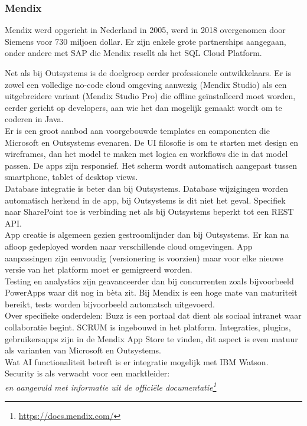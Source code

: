 \subsubsection{Mendix}

Mendix werd opgericht in Nederland in 2005, werd in 2018 overgenomen door Siemens voor 730 miljoen dollar. Er zijn enkele grote partnerships aangegaan, onder andere met SAP die Mendix resellt als het SQL Cloud Platform.

Net als bij Outsystems is de doelgroep eerder professionele ontwikkelaars. Er is zowel een volledige no-code cloud omgeving aanwezig (Mendix Studio) als een uitgebreidere variant (Mendix Studio Pro) die offline geïnstalleerd moet worden, eerder gericht op developers, aan wie het dan mogelijk gemaakt wordt om te coderen in Java.\\
Er is een groot aanbod aan voorgebouwde templates en componenten die Microsoft en Outsystems evenaren.
De UI filosofie is om te starten met design en wireframes, dan het model te maken met logica en workflows die in dat model passen. De apps zijn responsief. Het scherm wordt automatisch aangepast tussen smartphone, tablet of desktop views.\\
Database integratie is beter dan bij Outsystems. Database wijzigingen worden automatisch herkend in de app, bij Outsystems is dit niet het geval. Specifiek naar SharePoint toe is verbinding net als bij Outsystems beperkt tot een REST API.\\
App creatie is algemeen gezien gestroomlijnder dan bij Outsystems. Er kan na afloop gedeployed worden naar verschillende cloud omgevingen. %
App aanpassingen zijn eenvoudig (versionering is voorzien) maar voor elke nieuwe versie van het platform moet er gemigreerd worden.\\
Testing en analystics zijn geavanceerder dan bij concurrenten zoals bijvoorbeeld PowerApps waar dit nog in bèta zit. Bij Mendix is een hoge mate van maturiteit bereikt, tests worden bijvoorbeeld automatsch uitgevoerd.\\
Over specifieke onderdelen: Buzz is een portaal dat dient als sociaal intranet waar collaboratie begint. SCRUM is ingebouwd in het platform. Integraties, plugins, gebruikersapps zijn in de Mendix App Store te vinden, dit aspect is even matuur als varianten van Microsoft en Outsystems.\\
Wat AI functionaliteit betreft is er integratie mogelijk met IBM Watson.\\
Security is als verwacht voor een marktleider: \\ %
\autocite{Marvin2017a} \textit{en aangevuld met informatie uit de officiële documentatie\footnote{\url{https://docs.mendix.com/}}}



